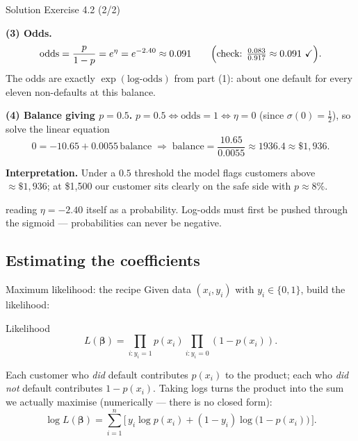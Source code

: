 \documentclass[aspectratio=169,11pt]{beamer}
\begin{document}
\begin{frame}{Solution \textemdash{} Exercise 4.2 (2/2)}
\begin{solutionbox}
\textbf{(3) Odds.}
\[
  \text{odds} = \frac{p}{1-p} = e^{\eta} = e^{-2.40} \approx 0.091
  \qquad\Bigl(\text{check: } \tfrac{0.083}{0.917}\approx 0.091\ \checkmark\Bigr).
\]
The odds are exactly $\exp(\text{log-odds})$ from part (1): about one
default for every eleven non-defaults at this balance.

\vspace{1mm}
\textbf{(4) Balance giving $p=0.5$.}
$p=0.5 \iff \text{odds}=1 \iff \eta=0$ (since $\sigma(0)=\tfrac12$), so
solve the linear equation
\[
  0 = -10.65 + 0.0055\,\text{balance}
  \;\Longrightarrow\;
  \text{balance} = \frac{10.65}{0.0055} \approx 1936.4 \approx \$1{,}936 .
\]

\textbf{Interpretation.} Under a $0.5$ threshold the model flags
customers above $\approx\$1{,}936$; at \$1{,}500 our customer sits
clearly on the safe side with $p\approx 8\%$.
\end{solutionbox}
\begin{mistake}
reading $\eta=-2.40$ itself as a probability.
Log-odds must first be pushed through the sigmoid --- probabilities can
never be negative.
\end{mistake}
\end{frame}

\subsection{Estimating the coefficients}

\begin{frame}{Maximum likelihood: the recipe}
  Given data $(x_i, y_i)$ with $y_i \in \{0, 1\}$, build the
  likelihood:
  \begin{block}{Likelihood}
    \[
      L(\boldsymbol\beta) = \prod_{i: y_i = 1} p(x_i)
                            \prod_{i: y_i = 0} (1 - p(x_i)).
    \]
  \end{block}
  \begin{readme}
    Each customer who \emph{did} default contributes $p(x_i)$ to the
    product; each who \emph{did not} default contributes
    $1 - p(x_i)$. Taking logs turns the product into the sum we actually
    maximise (numerically --- there is no closed form):
    \[
      \log L(\boldsymbol\beta) = \sum_{i=1}^{n}
        \Big[\, y_i \log p(x_i) + (1 - y_i)\log\!\big(1 - p(x_i)\big)\,\Big].
    \]
  \end{readme}
\end{frame}
\end{document}
